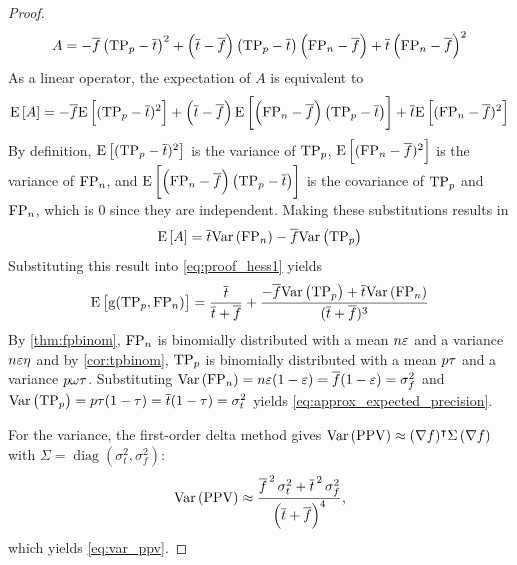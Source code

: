 \begin{proof}
\begin{equation}
    A = -\overline{f} \left(\mathrm{TP}_p - \overline{t}\right)^2 +
    \left(\overline{t}-\overline{f}\right)\left(\mathrm{TP}_p -
    \overline{t}\right)\left(\mathrm{FP}_n - \overline{f}\right) +
    \overline{t}\left(\mathrm{FP}_n - \overline{f}\right)^2
\end{equation}
As a linear operator, the expectation of $A$ is equivalent to
\begin{equation}
    \Expect{A} = -\overline{f} \Expect{(\TP_p - \overline{t})^2} + \left(\overline{t}-\overline{f}\right)\Expect{\left(\FP_n - \overline{f}\right)\left(\TP_p - \overline{t}\right)} + \overline{t}\Expect{(\FP_n - \overline{f})^2}
\end{equation}
By definition, $\Expect{(\TP_p - \overline{t})^2}$ is the variance of $\mathrm{TP}_p$, $\Expect{(\FP_n - \overline{f})^2}$ is the variance of $\mathrm{FP}_n$, and $\Expect{\left(\FP_n - \overline{f}\right)\left(\TP_p - \overline{t}\right)}$ is the covariance of $\mathrm{TP}_p$ and $\mathrm{FP}_n$, which is $0$ since they are independent.
Making these substitutions results in
\begin{equation}
    \Expect{A} = \overline{t} \Var{\FP_n} - \overline{f} \Var{\TP_p}
\end{equation}
Substituting this result into \cref{eq:proof_hess1} yields
\begin{equation}
    \Expect{\Fun{g}(\TP_p,\FP_n)} =
    \frac{\overline{t}}{\overline{t}+\overline{f}} +
    \frac{-\overline{f} \Var{\TP_p} +
    \overline{t}\Var{\FP_n}}{(\overline{t} + \overline{f})^3}
\end{equation}
By \cref{thm:fpbinom}, $\mathrm{FP}_n$ is binomially distributed with a mean $n \varepsilon$ and a variance $n \varepsilon \eta$ and by \cref{cor:tpbinom}, $\mathrm{TP}_p$ is binomially distributed with a mean $p \tau$ and a variance $p \omega \tau$.
Substituting $\Var{\FP_n} = n \fprate(1-\fprate) = \overline{f}(1-\fprate) = \sigma_f^2$ and $\Var{\TP_p} = p \tprate(1-\tprate) = \overline{t}(1-\tprate) = \sigma_t^2$ yields \cref{eq:approx_expected_precision}.

For the variance, the first-order delta method gives $\Var{\PPV} \approx (\nabla f)^\intercal \Sigma\,(\nabla f)$ with $\Sigma = \operatorname{diag}(\sigma_t^2, \sigma_f^2)$:
\begin{equation}
    \Var{\PPV} \approx \frac{\overline{f}^{\,2}\,\sigma_t^2 + \overline{t}^{\,2}\,\sigma_f^2}{\left(\overline{t} + \overline{f}\right)^4},
\end{equation}
which yields \cref{eq:var_ppv}.
\end{proof}

